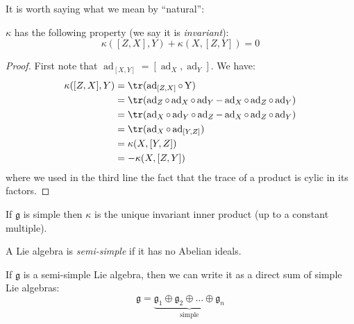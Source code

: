 \documentclass{jknotes}
\begin{document}
It is worth saying what we mean by ``natural'':
\begin{lemma}
    \(\kappa\) has the following property (we say it is \emph{invariant}):
    \begin{equation}
        \kappa([Z,X],Y) + \kappa(X,[Z,Y]) = 0
    \end{equation}
\end{lemma}
\begin{proof}
    First note that \(\operatorname{ad}_{[X,Y]} = [\operatorname{ad}_X,\operatorname{ad}_Y]\). We have:
    \begin{align}
        \kappa([Z,X],Y) &= \tr(\operatorname{ad}_{[Z,X]} \circ\operatorname{Y})\\
        &= \tr(\operatorname{ad}_Z\circ\operatorname{ad}_X\circ\operatorname{ad}_Y - \operatorname{ad}_X\circ\operatorname{ad}_Z\circ\operatorname{ad}_Y) \\
        &= \tr(\operatorname{ad}_X\circ\operatorname{ad}_Y\circ\operatorname{ad}_Z - \operatorname{ad}_X\circ\operatorname{ad}_Z\circ\operatorname{ad}_Y) \\
        &= \tr(\operatorname{ad}_X\circ\operatorname{ad}_{[Y,Z]}) \\
        &= \kappa(X,[Y,Z]) \\
        &= - \kappa(X,[Z,Y])
    \end{align}
    where we used in the third line the fact that the trace of a product is cylic in its factors.
\end{proof}
If \(\mathfrak{g}\) is simple then \(\kappa\) is the unique invariant inner product (up to a constant multiple).

\begin{defn}
    A Lie algebra is \emph{semi-simple} if it has no Abelian ideals.
\end{defn}
\begin{lemma}
    If \(\mathfrak{g}\) is a semi-simple Lie algebra, then we can write it as a direct sum of simple Lie algebras:
    \begin{equation}
        \mathfrak{g} = \underbrace{\mathfrak{g}_1 \oplus \mathfrak{g}_2 \oplus \dots \oplus \mathfrak{g}_n}_\text{simple}
    \end{equation}
\end{lemma}
\end{document}
